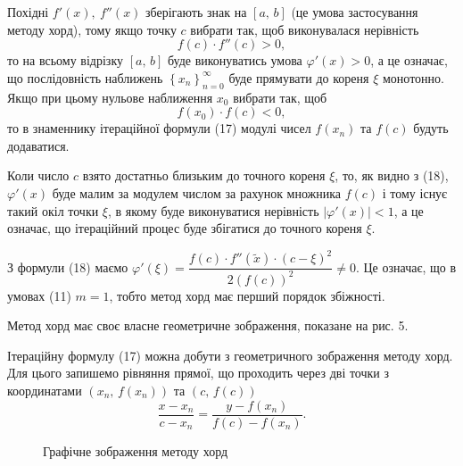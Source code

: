 \documentclass[14pt,a4paper,titlepage]{extarticle}
\begin{document}
Похідні $f'(x),\ f''(x)$ зберігають знак на $[a,\,b]$ (це умова застосування методу хорд), тому якщо точку $c$ вибрати так, щоб виконувалася нерівність
\begin{equation}
f(c)\cdot f''(c) > 0,
\end{equation}
то на всьому відрізку $[a,\,b]$ буде виконуватись умова $\varphi'(x) > 0$, а це означає, що послідовність наближень $\left\lbrace x_n \right\rbrace_{n = 0}^\infty$ буде прямувати до кореня $\xi$ монотонно. Якщо при цьому нульове наближення $x_0$ вибрати так, щоб
\begin{equation}
f(x_0)\cdot f(c) < 0,
\end{equation}
то в знаменнику ітераційної формули (17) модулі чисел $f(x_n)$ та $f(c)$ будуть додаватися.

Коли число $c$ взято достатньо близьким до точного кореня $\xi$, то, як видно з (18), $\varphi'(x)$ буде малим за модулем числом за рахунок множника $f(c)$ і тому існує такий окіл точки $\xi$, в якому буде виконуватися нерівність $\left|\varphi'(x)\right| < 1$, а це означає, що ітераційний процес буде збігатися до точного кореня $\xi$.

З формули (18) маємо $\varphi'(\xi) = \dfrac{f(c)\cdot f''(\tilde{x})\cdot (c - \xi)^2}{2(f(c))^2} \neq 0$. Це означає, що в умовах (11) $m = 1$, тобто метод хорд має перший порядок збіжності.

Метод хорд має своє власне геометричне зображення, показане на рис. 5.

Ітераційну формулу (17) можна добути з геометричного зображення методу хорд. Для цього запишемо рівняння прямої, що проходить через дві точки з координатами $(x_n,\,f(x_n))$ та $(c,\,f(c))$
$$
\frac{x - x_n}{c - x_n} = \frac{y - f(x_n)}{f(c) - f(x_n)}.
$$

\begin{figure}[h]
\caption{Графічне зображення методу хорд}
\end{figure}
\end{document}
